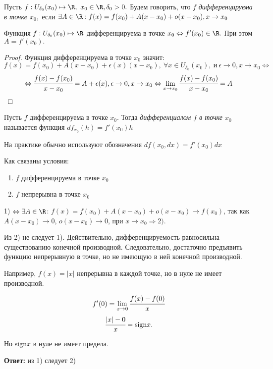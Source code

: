 \begin{definition}
    Пусть $f: U_{\delta_{0}}(x_{0}) \mapsto \R, \ x_{0} \in \R, \delta_{0} > 0.$ Будем говорить, что $f$ \textit{дифференцируема в точке $x_{0},$} если $\exists A \in \R: f(x) = f(x_{0}) + A(x-x_{0}) + o(x-x_{0}), x\to x_{0}$
\end{definition}

\begin{theorem}
    Функция $f: U_{\delta_{0}}(x_{0}) \mapsto \R$ дифференцируема в точке $x_{0} \Leftrightarrow f'(x_{0}) \in \R.$ При этом $A = f'(x_{0}).$
\end{theorem}
\begin{proof}
    Функция дифференцируема в точке $x_{0}$ значит:
    $$  f(x) = f(x_{0}) + A(x-x_{0}) + \epsilon(x)(x-x_{0}), \ \forall x \in U_{\delta_{0}}(x_{0}), \ \textrm{и} \ \epsilon \to 0, x \to x_{0} \Leftrightarrow$$
    $$
    \Leftrightarrow \cfrac{f(x)- f(x_{0})}{x - x_{0}} = A  + \epsilon(x), \epsilon \to 0, x \to x_{0} \Leftrightarrow  \lim\limits_{x \to x_{0}} \cfrac{f(x)- f(x_{0})}{x - x_{0}} = A$$
\end{proof}

\begin{definition}
    Пусть $f$ дифференцируема в точке $x_{0}$. Тогда \textit{дифференциалом $f$ в точке $x_{0}$} называется функция $df_{x_{0}}(h) = f'(x_{0})h$

    На практике обычно используют обозначения $df(x_{0}, dx) = f'(x_{0})dx$
\end{definition}

\begin{problem}
    Как связаны условия:
    \begin{enumerate}
        \item $f$ дифференцируема в точке $x_{0}$
        \item $f$ непрерывна в точке $x_{0}$
    \end{enumerate}
\end{problem}
\begin{solution}
    1) $\Leftrightarrow \exists A \in \R$: $f(x) = f(x_{0}) + A(x-x_{0}) + o(x-x_{0}) \to f(x_{0})$, так как $ A(x-x_{0}) \to 0$, $o(x-x_{0}) \to 0$, при $x\to x_{0} \Rightarrow 2)$.

    Из 2) не следует 1). Действительно, дифференцируемость равносильна существованию конечной производной. Следовательно, достаточно предъявить функцию непрерывную в точке, но не имеющую в ней конечной производной. 
    
    Например, $f(x) = |x|$ непрерывна в каждой точке, но в нуле не имеет производной.

    $$f'(0) = \lim\limits_{x\to 0} \cfrac{f(x) - f(0)}{x}$$
    $$
    \cfrac{|x| - 0}{x} = \text{sign}x.$$

    Но $\text{sign}x$ в нуле не имеет предела.
    
     \textbf{Ответ:} из 1) следует 2)
\end{solution}